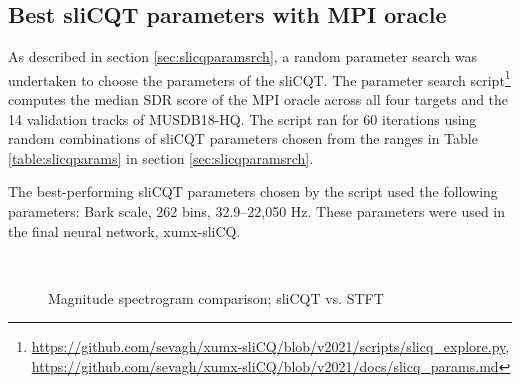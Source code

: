 \documentclass[report.tex]{subfiles}
\begin{document}
\subsection{Best sliCQT parameters with MPI oracle}
\label{sec:slicqparamresults}

As described in section \ref{sec:slicqparamsrch}, a random parameter search was undertaken to choose the parameters of the sliCQT. The parameter search script\footnote{\url{https://github.com/sevagh/xumx-sliCQ/blob/v2021/scripts/slicq_explore.py}, \url{https://github.com/sevagh/xumx-sliCQ/blob/v2021/docs/slicq_params.md}} computes the median SDR score of the MPI oracle across all four targets and the 14 validation tracks of MUSDB18-HQ. The script ran for 60 iterations using random combinations of sliCQT parameters chosen from the ranges in Table \ref{table:slicqparams} in section \ref{sec:slicqparamsrch}.

The best-performing sliCQT parameters chosen by the script used the following parameters: Bark scale, 262 bins, 32.9--22,050 Hz. These parameters were used in the final neural network, xumx-sliCQ.

\begin{figure}[ht]
	\centering
	\\
	\caption{Magnitude spectrogram comparison; sliCQT vs. STFT}
	\label{fig:bipolarslicqs}
\end{figure}
\end{document}
